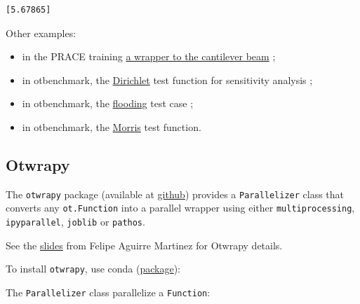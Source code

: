 \documentclass[11pt]{article}
\newenvironment{Shaded}{}{}
\newcommand{\NormalTok}[1]{{#1}}
\newcommand{\ExtensionTok}[1]{{#1}}
\newcommand{\AttributeTok}[1]{\textcolor[rgb]{0.49,0.56,0.16}{{#1}}}
\begin{document}
    \begin{Verbatim}[commandchars=\\\{\}]
[5.67865]
    \end{Verbatim}

    Other examples:
\begin{itemize}
\item in the PRACE training
\href{https://github.com/mbaudin47/hpcuqtraining/blob/773ddaed56339ddb548f82a2ff16bfcf5c00be2c/2019/Scripts/wrapper.py}{a
wrapper to the cantilever beam} ;
\item in otbenchmark, the
\href{https://github.com/mbaudin47/otbenchmark/blob/f33a9c6694cc0bb3e2680164519b82e9f2983977/otbenchmark/DirichletSensitivity.py}{Dirichlet}
test function for sensitivity analysis ;
\item in otbenchmark, the
\href{https://github.com/mbaudin47/otbenchmark/blob/f33a9c6694cc0bb3e2680164519b82e9f2983977/examples/scripts/testCrue-classeOTPFun.py}{flooding}
test case ;
\item in otbenchmark, the
\href{https://github.com/mbaudin47/otbenchmark/blob/f33a9c6694cc0bb3e2680164519b82e9f2983977/otbenchmark/MorrisSensitivity.py}{Morris}
test function.
\end{itemize}

    \hypertarget{otwrapy}{%
\subsection{Otwrapy}\label{otwrapy}}

The \texttt{otwrapy} package (available at
\href{https://github.com/openturns/otwrapy}{github}) provides a
\texttt{Parallelizer} class that converts any \texttt{ot.Function} into
a parallel wrapper using either \texttt{multiprocessing},
\texttt{ipyparallel}, \texttt{joblib} or \texttt{pathos}.

See the
\href{https://felipeam86.github.io/HPC-Uncertainties-PRACE/}{slides}
from Felipe Aguirre Martinez for Otwrapy details.

To install \texttt{otwrapy}, use conda
(\href{https://anaconda.org/conda-forge/otwrapy}{package}):

\begin{Shaded}
\end{Shaded}

The \texttt{Parallelizer} class parallelize a \texttt{Function}:
\end{document}
